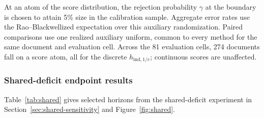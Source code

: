 \documentclass[11pt]{article}
\begin{document}
At an atom of the score distribution, the rejection probability $\gamma$ at the boundary is chosen to attain 5\% size in the calibration sample.  Aggregate error rates use the Rao--Blackwellized expectation over this auxiliary randomization.  Paired comparisons use one realized auxiliary uniform, common to every method for the same document and evaluation cell.  Across the 81 evaluation cells, 274 documents fall on a score atom, all for the discrete $h_{\mathrm{ind},1/e}$; continuous scores are unaffected.

\FloatBarrier
\subsubsection{Shared-deficit endpoint results}
\label{sec:shared-endpoints}

Table~\ref{tab:shared} gives selected horizons from the shared-deficit
experiment in Section~\ref{sec:shared-sensitivity} and Figure~\ref{fig:shared}.
\end{document}
